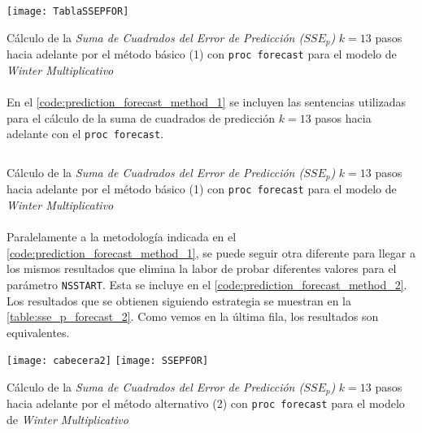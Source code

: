 \documentclass[a4paper, spanish]{article}
\begin{document}
    \begin{table}[htb!]
      \centering
      \texttt{[image: TablaSSEPFOR]}
      \caption{Cálculo de la \emph{Suma de Cuadrados del Error de Predicción ($SSE_p$)} $k = 13$ pasos hacia adelante por el método básico (1) con \texttt{proc forecast} para el modelo de \emph{Winter Multiplicativo}}
      \label{table:sse_p_forecast_1}
    \end{table}

    \paragraph{}
    En el \autoref{code:prediction_forecast_method_1} se incluyen las sentencias utilizadas para el cálculo de la suma de cuadrados de predicción $k = 13$ pasos hacia adelante con el \texttt{proc forecast}.

    \begin{listing}[htb!]
      \centering
      \inputminted{SAS}{./res/code/e-prediction-forecast-method-1.sas}
      \caption{Cálculo de la \emph{Suma de Cuadrados del Error de Predicción ($SSE_p$)} $k = 13$ pasos hacia adelante por el método básico (1) con \texttt{proc forecast} para el modelo de \emph{Winter Multiplicativo}}
      \label{code:prediction_forecast_method_1}
    \end{listing}

    \paragraph{}
    Paralelamente a la metodología indicada en el \autoref{code:prediction_forecast_method_1}, se puede seguir otra diferente para llegar a los mismos resultados que elimina la labor de probar diferentes valores para el parámetro \texttt{NSSTART}. Esta se incluye en el \autoref{code:prediction_forecast_method_2}. Los resultados que se obtienen siguiendo estrategia se muestran en la \autoref{table:sse_p_forecast_2}. Como vemos en la última fila, los resultados son equivalentes.

    \begin{table}[htb!]
      \centering
      \texttt{[image: cabecera2]}
      \texttt{[image: SSEPFOR]}
      \caption{Cálculo de la \emph{Suma de Cuadrados del Error de Predicción ($SSE_p$)} $k = 13$ pasos hacia adelante por el método alternativo (2) con \texttt{proc forecast} para el modelo de \emph{Winter Multiplicativo}}
      \label{table:sse_p_forecast_2}
    \end{table}
\end{document}
